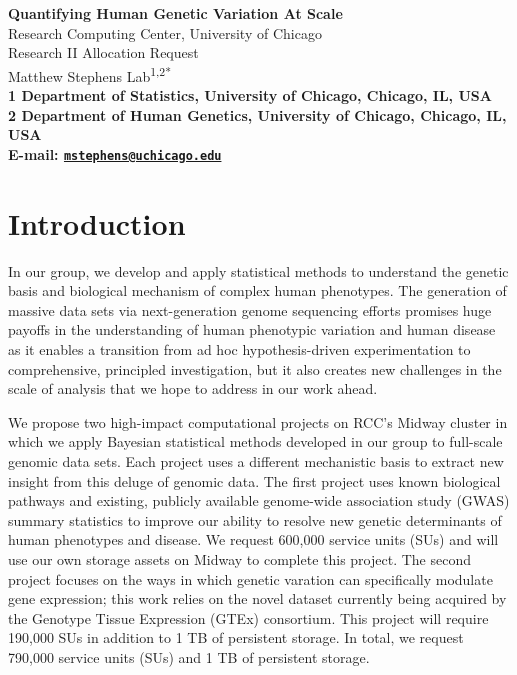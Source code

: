 \documentclass[10pt]{article}
\date{}
\begin{document}
\begin{flushleft}
{\Large
\textbf{Quantifying Human Genetic Variation At Scale}
}
\\
\smallskip
  {
    \large Research Computing Center, University of Chicago
  }
\\
  {
    \large Research II Allocation Request
  }
  \\
\smallskip
  Matthew Stephens Lab\textsuperscript{1,2*}\\
\bf{1} Department of Statistics, University of Chicago,  Chicago,  IL,  USA
\\
\bf{2} Department of Human Genetics, University of Chicago,  Chicago,  IL,  USA
\\

\textasteriskcentered{} E-mail:   \href{mailto:mstephens@uchicago.edu}{\nolinkurl{mstephens@uchicago.edu}}

\end{flushleft}

\section*{Introduction}

In our group, we develop and apply statistical methods to understand
the genetic basis and biological mechanism of complex human
phenotypes. The generation of massive data sets via next-generation
genome sequencing efforts promises huge payoffs in the understanding
of human phenotypic variation and human disease as it enables a
transition from ad hoc hypothesis-driven experimentation to
comprehensive, principled investigation, but it also creates new
challenges in the scale of analysis that we hope to address in our
work ahead.

We propose two high-impact computational projects on RCC's Midway
cluster in which we apply Bayesian statistical methods developed in
our group to full-scale genomic data sets. Each project uses a
different mechanistic basis to extract new insight from this deluge of
genomic data. The first project uses known biological pathways and
existing, publicly available genome-wide association study (GWAS)
summary statistics to improve our ability to resolve new genetic
determinants of human phenotypes and disease. We request 600,000
service units (SUs) and will use our own storage assets on Midway to
complete this project. The second project focuses on the ways in which
genetic varation can specifically modulate gene expression; this work
relies on the novel dataset currently being acquired by the Genotype
Tissue Expression (GTEx) consortium. This project will require 190,000
SUs in addition to 1 TB of persistent storage. In total, we request
790,000 service units (SUs) and 1 TB of persistent storage.
\end{document}
